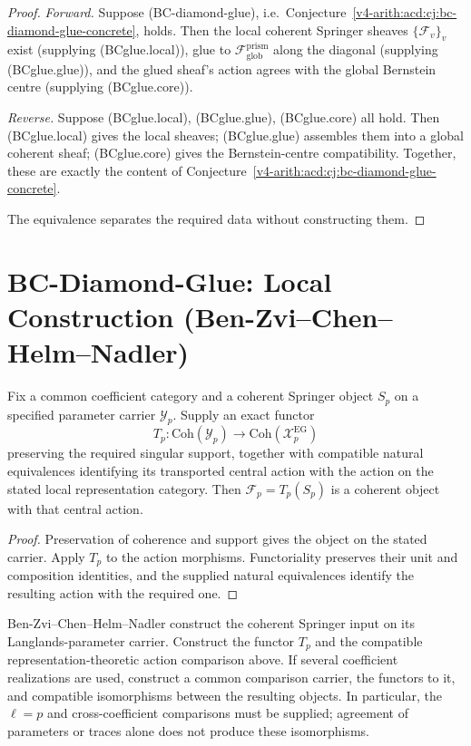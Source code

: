 \begin{proof}
\emph{Forward.} Suppose (BC-diamond-glue), i.e.\
Conjecture~\ref{v4-arith:acd:cj:bc-diamond-glue-concrete}, holds. Then the
local coherent Springer sheaves \(\{\mathcal{F}_{v}\}_{v}\) exist
(supplying (BCglue.local)), glue to
\(\mathcal{F}_{\mathrm{glob}}^{\mathrm{prism}}\) along the diagonal
(supplying (BCglue.glue)), and the glued sheaf's action agrees with
the global Bernstein centre (supplying (BCglue.core)).

\emph{Reverse.} Suppose (BCglue.local), (BCglue.glue),
(BCglue.core) all hold. Then (BCglue.local) gives the local sheaves;
(BCglue.glue) assembles them into a global coherent sheaf;
(BCglue.core) gives the Bernstein-centre compatibility. Together,
these are exactly the content of
Conjecture~\ref{v4-arith:acd:cj:bc-diamond-glue-concrete}.

The equivalence separates the required data without constructing them.
\end{proof}

\section{BC-Diamond-Glue: Local Construction (Ben-Zvi--Chen--Helm--Nadler)}
\label{v4-arith:bcglue-k5:local}

\begin{theorem}
\label{v4-arith:bcglue-k5:thm:local-BZCHN-plus-EG}
Fix a common coefficient category and a coherent Springer object
\(S_p\) on a specified parameter carrier \(\mathcal Y_p\).
Supply an exact functor
\[
 T_p:\mathrm{Coh}(\mathcal Y_p)\longrightarrow
       \mathrm{Coh}(\mathcal X_p^{\mathrm{EG}})
\]
preserving the required singular support, together with compatible
natural equivalences identifying its transported central action with
the action on the stated local representation category. Then
\(\mathcal F_p=T_p(S_p)\) is a coherent object with that central action.
\end{theorem}
\begin{proof}
Preservation of coherence and support gives the object on the stated
carrier. Apply \(T_p\) to the action morphisms. Functoriality preserves
their unit and composition identities, and the supplied natural
equivalences identify the resulting action with the required one.
\end{proof}
\begin{remark}
\label{v4-arith:bcglue-k5:rem:domain-local}
Ben-Zvi--Chen--Helm--Nadler construct the coherent Springer input on
its Langlands-parameter carrier. Construct the functor \(T_p\) and
the compatible representation-theoretic action comparison above.
If several coefficient realizations are used, construct a common
comparison carrier, the functors to it, and compatible isomorphisms
between the resulting objects. In particular, the \(\ell=p\) and
cross-coefficient comparisons must be supplied; agreement of
parameters or traces alone does not produce these isomorphisms.
\end{remark}

